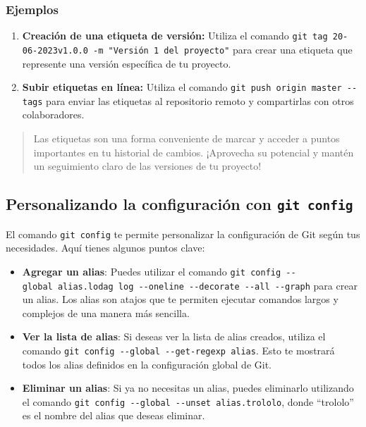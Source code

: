 \documentclass[
  letterpaper,
  DIV=11,
  numbers=noendperiod]{scrartcl}
\begin{document}
\hypertarget{ejemplos}{%
\subsubsection{Ejemplos}\label{ejemplos}}

\begin{enumerate}
\def\labelenumi{\arabic{enumi}.}
\item
  \textbf{Creación de una etiqueta de versión:} Utiliza el comando
  \texttt{git\ tag\ 20-06-2023v1.0.0\ -m\ "Versión\ 1\ del\ proyecto"}
  para crear una etiqueta que represente una versión específica de tu
  proyecto.
\item
  \textbf{Subir etiquetas en línea:} Utiliza el comando
  \texttt{git\ push\ origin\ master\ -\/-tags} para enviar las etiquetas
  al repositorio remoto y compartirlas con otros colaboradores.
\end{enumerate}

\begin{quote}
Las etiquetas son una forma conveniente de marcar y acceder a puntos
importantes en tu historial de cambios. ¡Aprovecha su potencial y mantén
un seguimiento claro de las versiones de tu proyecto!
\end{quote}

\hypertarget{personalizando-la-configuraciuxf3n-con-git-config}{%
\subsection{\texorpdfstring{Personalizando la configuración con
\texttt{git\ config}}{Personalizando la configuración con git config}}\label{personalizando-la-configuraciuxf3n-con-git-config}}

El comando \texttt{git\ config} te permite personalizar la configuración
de Git según tus necesidades. Aquí tienes algunos puntos clave:

\begin{itemize}
\item
  \textbf{Agregar un alias}: Puedes utilizar el comando
  \texttt{git\ config\ -\/-global\ alias.lodag\ \textquotesingle{}log\ -\/-oneline\ -\/-decorate\ -\/-all\ -\/-graph\textquotesingle{}}
  para crear un alias. Los alias son atajos que te permiten ejecutar
  comandos largos y complejos de una manera más sencilla.
\item
  \textbf{Ver la lista de alias}: Si deseas ver la lista de alias
  creados, utiliza el comando
  \texttt{git\ config\ -\/-global\ -\/-get-regexp\ alias}. Esto te
  mostrará todos los alias definidos en la configuración global de Git.
\item
  \textbf{Eliminar un alias}: Si ya no necesitas un alias, puedes
  eliminarlo utilizando el comando
  \texttt{git\ config\ -\/-global\ -\/-unset\ alias.trololo}, donde
  ``trololo'' es el nombre del alias que deseas eliminar.
\end{itemize}
\end{document}
